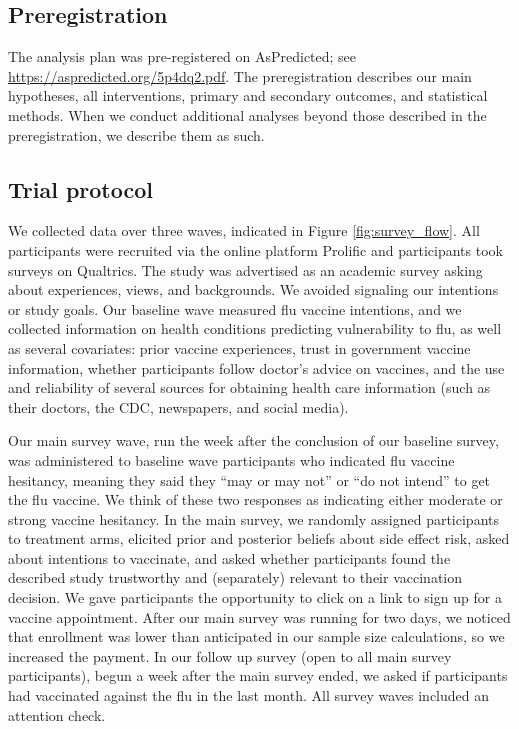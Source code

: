 
\subsection{Preregistration}
The analysis plan was pre-registered on AsPredicted; see \url{https://aspredicted.org/5p4dq2.pdf}. 
The preregistration describes our main hypotheses, all interventions, primary and secondary 
outcomes, and statistical methods. When we conduct additional analyses beyond those described 
in the preregistration, we describe them as such.

\subsection{Trial protocol}

We collected data over three waves, indicated in Figure \ref{fig:survey_flow}.
All participants were recruited via the online platform 
Prolific and participants took surveys on Qualtrics.  The study was advertised
as an academic survey asking about experiences, views, and backgrounds. We avoided
signaling our intentions or study goals. Our baseline wave measured flu vaccine 
intentions, and we collected information on health conditions predicting vulnerability to flu, 
as well as several covariates: prior vaccine experiences, trust in government vaccine 
information, whether participants follow doctor’s advice on vaccines, and the use and 
reliability of several sources for obtaining  health care information 
(such as their doctors, the CDC, newspapers, and social media). 

Our main survey wave, run the week after the conclusion of our baseline survey, was administered 
to baseline wave participants who indicated flu vaccine hesitancy,
meaning they said they “may or may not” or “do not intend” to get the flu vaccine. We think of these
two responses as indicating either moderate or strong vaccine hesitancy. 
In the  main survey, we randomly assigned participants to treatment arms, 
elicited prior and posterior beliefs about side effect risk, asked about intentions to 
vaccinate, and asked whether participants found the described study trustworthy and 
(separately) relevant to their vaccination decision. We gave participants the opportunity 
to click on a link to sign up for a vaccine appointment. 
After our main survey was running for two days, we noticed that enrollment was lower
than anticipated in our sample size calculations, so we increased the payment. In our 
follow up survey (open to all main survey participants), begun a week after the 
main survey ended, we asked if participants had vaccinated against the flu in the last month. 
All survey waves included an attention check. 


